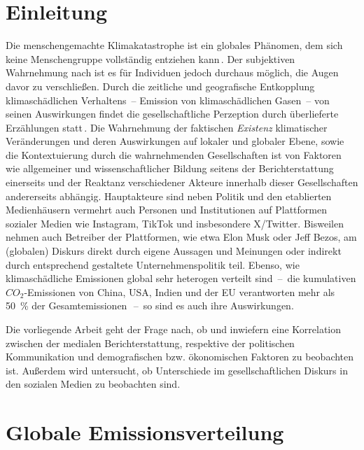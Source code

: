 \section{Einleitung}

Die menschengemachte Klimakatastrophe ist ein globales Phänomen, dem sich keine Menschengruppe vollständig entziehen kann\,\cite{Book.Calvin.IPCCClimateChange2023SynthesisReport.2023}.
Der subjektiven Wahrnehmung nach ist es für Individuen jedoch durchaus möglich, die Augen davor zu verschließen. %
Durch die zeitliche und geografische Entkopplung klimaschädlichen Verhaltens~-- Emission von klimaschädlichen Gasen~-- von seinen Auswirkungen findet die gesellschaftliche Perzeption durch überlieferte Erzählungen statt\,\cite{Article.Moser.CommunicatingClimateChangeHistoryChallengesProcessAndFutureDirections.2009}. %
Die Wahrnehmung der faktischen \textit{Existenz} klimatischer Veränderungen und deren Auswirkungen auf lokaler und globaler Ebene, sowie die Kontextuierung durch die wahrnehmenden Gesellschaften ist von Faktoren wie allgemeiner und wissenschaftlicher Bildung seitens der Berichterstattung einerseits und der Reaktanz verschiedener Akteure innerhalb dieser Gesellschaften andererseits abhängig.
Hauptakteure sind neben Politik und den etablierten Medienhäusern vermehrt auch Personen und Institutionen auf Plattformen sozialer Medien wie Instagram, TikTok und insbesondere X/Twitter.
Bisweilen nehmen auch Betreiber der Plattformen, wie etwa Elon Musk oder Jeff Bezos, am (globalen) Diskurs direkt durch eigene Aussagen und Meinungen oder indirekt durch entsprechend gestaltete Unternehmenspolitik teil.
Ebenso, wie klimaschädliche Emissionen global sehr heterogen verteilt sind~--~die kumulativen \(CO_2\)-Emissionen von China, USA, Indien und der EU verantworten mehr als \qty{50}{\percent} der Gesamtemissionen\,\cite{Misc.Centre.GHGEmissionsOfAllWorldCountries.2023}~--~so sind es auch ihre Auswirkungen.

Die vorliegende Arbeit geht der Frage nach, ob und inwiefern eine Korrelation zwischen der medialen Berichterstattung, respektive der politischen Kommunikation und demografischen bzw. ökonomischen Faktoren zu beobachten ist.
Außerdem wird untersucht, ob Unterschiede im gesellschaftlichen Diskurs in den sozialen Medien zu beobachten sind.

\section{Globale Emissionsverteilung}

